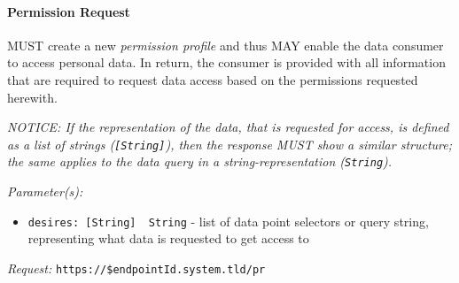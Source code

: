\documentclass[12pt,english,a4paper,titlepage,cleardoublepage=empty,dottedtoc]{report}
\newenvironment{Shaded}{\begin{snugshade}}{\end{snugshade}}
\newcommand{\DataTypeTok}[1]{\textcolor[rgb]{0.13,0.29,0.53}{#1}}
\newcommand{\DecValTok}[1]{\textcolor[rgb]{0.00,0.00,0.81}{#1}}
\newcommand{\StringTok}[1]{\textcolor[rgb]{0.31,0.60,0.02}{#1}}
\newcommand{\OtherTok}[1]{\textcolor[rgb]{0.56,0.35,0.01}{#1}}
\newcommand{\FunctionTok}[1]{\textcolor[rgb]{0.00,0.00,0.00}{#1}}
\newcommand{\ErrorTok}[1]{\textcolor[rgb]{0.64,0.00,0.00}{\textbf{#1}}}
\providecommand{\tightlist}{%
  \setlength{\itemsep}{0pt}\setlength{\parskip}{0pt}}
\begin{document}
\begin{Shaded}
\end{Shaded}

\hypertarget{spec_api_permission-request}{\paragraph{Permission
Request}\label{spec_api_permission-request}}

MUST create a new \emph{permission profile} and thus MAY enable the data
consumer to access personal data. In return, the consumer is provided
with all information that are required to request data access based on
the permissions requested herewith.

\emph{NOTICE: If the representation of the data, that is requested for
access, is defined as a list of strings (\texttt{{[}String{]}}), then
the response MUST show a similar structure; the same applies to the data
query in a string-representation (\texttt{String}).}

\emph{Parameter(s):}

\begin{itemize}
\tightlist
\item
  \texttt{desires:\ {[}String{]}\ \textbar{}\textbar{}\ String} - list
  of data point selectors or query string, representing what data is
  requested to get access to
\end{itemize}

\emph{Request:} \texttt{https://\$endpointId.system.tld/pr}
\end{document}
